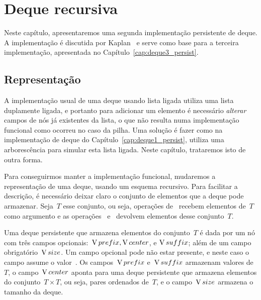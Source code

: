 \documentclass[main.tex]{subfiles}
\begin{document}
\chapter{Deque recursiva} \label{cap:deque2_persist}

Neste capítulo, apresentaremos uma segunda implementação persistente de deque. A implementação é discutida por Kaplan~\cite{Kaplan2001} e serve como base para a terceira implementação, apresentada no Capítulo~\ref{cap:deque3_persist}.


\section{Representação}

A implementação usual de uma deque usando lista ligada utiliza uma lista duplamente ligada, e portanto para adicionar um elemento é necessário \emph{alterar} campos de nós já existentes da lista, o que não resulta numa implementação funcional como ocorreu no caso da pilha. Uma solução é fazer como na implementação de deque do Capítulo~\ref{cap:deque1_persist}, utiliza uma arborescência para simular esta lista ligada. Neste capítulo, trataremos isto de outra forma.

Para conseguirmos manter a implementação funcional, mudaremos a representação de uma deque, usando um esquema recursivo. Para facilitar a descrição, é necessário deixar claro o conjunto de elementos que a deque pode armazenar. Seja~$T$ esse conjunto, ou seja, operações de~ recebem elementos de~$T$ como argumento e as operações~ e~ devolvem elementos desse conjunto~$T$.

Uma deque persistente que armazena elementos do conjunto~$T$ é dada por um nó com três campos opcionais:~$\operatorname{V}{prefix}, \operatorname{V}{center}$, e $\operatorname{V}{suffix}$; além de um campo obrigatório~$\operatorname{V}{size}$. Um campo opcional pode não estar presente, e neste caso o campo assume o valor~. Os campos~$\operatorname{V}{prefix}$ e~$\operatorname{V}{suffix}$ armazenam valores de~$T$, o campo~$\operatorname{V}{center}$ aponta para uma deque persistente que armazena elementos do conjunto~$T \times T$, ou seja, pares ordenados de~$T$, e o campo~$\operatorname{V}{size}$ armazena o tamanho da deque.
\end{document}
